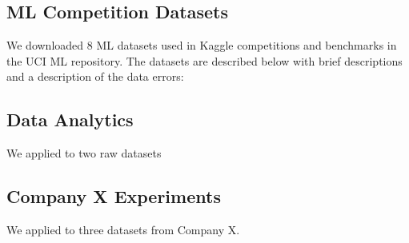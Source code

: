 \subsection{ML Competition Datasets}
We downloaded 8 ML datasets used in Kaggle competitions and benchmarks in the UCI ML repository. The datasets are described below with brief descriptions and a description of the data errors:


\subsection{Data Analytics}
We applied \sys to two raw datasets


\subsection{Company X Experiments}
We applied \sys to three datasets from Company X.



